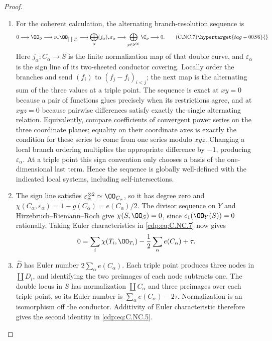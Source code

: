 \begin{proof}
\begin{enumerate}[label=\arabic*.,leftmargin=*]
\item For the coherent calculation, the alternating branch-resolution sequence is
\[
 0\longrightarrow\OO_S\longrightarrow\nu_*\OO_{\coprod T_i}
 \longrightarrow\bigoplus_\alpha(j_\alpha)_*\varepsilon_\alpha
 \longrightarrow\bigoplus_{p\in S^{[3]}}\C_p
 \longrightarrow0.
 \tag{C.NC.7}\hypertarget{tag-00S6}{}\label{cdp:eq:C.NC.7}
\]
Here $j_\alpha:C_\alpha\to S$ is the finite normalization map of that double curve, and $\varepsilon_\alpha$ is the sign line of its two-sheeted conductor covering. Locally order the branches and send $(f_i)$ to $(f_j-f_i)_{i<j}$; the next map is the alternating sum of the three values at a triple point. The sequence is exact at $xy=0$ because a pair of functions glues precisely when its restrictions agree, and at $xyz=0$ because pairwise differences satisfy exactly the single alternating relation. Equivalently, compare coefficients of convergent power series on the three coordinate planes; equality on their coordinate axes is exactly the condition for these series to come from one series modulo $xyz$. Changing a local branch ordering multiplies the appropriate difference by $-1$, producing $\varepsilon_\alpha$. At a triple point this sign convention only chooses a basis of the one-dimensional last term. Hence the sequence is globally well-defined with the indicated local systems, including self-intersections.

\item The sign line satisfies $\varepsilon_\alpha^{\otimes2}\simeq\OO_{C_\alpha}$, so it has degree zero and $\chi(C_\alpha,\varepsilon_\alpha)=1-g(C_\alpha)=e(C_\alpha)/2$. The divisor sequence on $Y$ and Hirzebruch--Riemann--Roch give $\chi(S,\OO_S)=0$, since $c_1(\OO_Y(S))=0$ rationally. Taking Euler characteristics in \eqref{cdp:eq:C.NC.7} now gives
\[
 0=\sum_i\chi(T_i,\OO_{T_i})-\frac12\sum_\alpha e(C_\alpha)+\tau.
\]

\item $\widehat D$ has Euler number $2\sum_\alpha e(C_\alpha)$. Each triple point produces three nodes in $\coprod D_i$, and identifying the two preimages of each node subtracts one. The double locus in $S$ has normalization $\coprod C_\alpha$ and three preimages over each triple point, so its Euler number is $\sum_\alpha e(C_\alpha)-2\tau$. Normalization is an isomorphism off the conductor. Additivity of Euler characteristic therefore gives the second identity in \eqref{cdp:eq:C.NC.5}.

\end{enumerate}
\end{proof}
